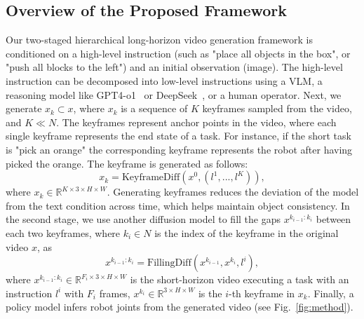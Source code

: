 \documentclass[letterpaper, 10 pt, conference]{ieeeconf}  %
\begin{document}


\subsection{Overview of the Proposed Framework}
\label{sec:overview}
Our two-staged hierarchical long-horizon video generation framework is conditioned on a high-level instruction (such as "place all objects in the box", or "push all blocks to the left") and an initial observation (image). The high-level instruction can be decomposed into low-level instructions using a VLM, a reasoning model like GPT4-o1~\cite{gpt4o1} or DeepSeek~\cite{deepseek}, or a human operator. Next, we generate $x_k \subset x$, where $x_k$ is a sequence of $K$ keyframes sampled from the video, and $K \ll N$. The keyframes represent anchor points in the video, where each single keyframe represents the end state of a task. For instance, if the short task is "pick an orange" the corresponding keyframe represents the robot after having picked the orange. The keyframe is generated as follows:
\begin{equation}
    x_k = \textrm{KeyframeDiff}(x^0,(l^1,...,l^K)),
\end{equation}
where $x_k \in \mathbb{R}^{  K \times 3 \times H \times W}$. Generating keyframes reduces the deviation of the model from the text condition across time, which helps maintain object consistency. In the second stage, we use another diffusion model to fill the gaps $x^{k_{i-1}:k_{i}}$ between each two keyframes, where $k_i \in N$ is the index of the keyframe in the original video $x$, as
\begin{equation}
    x^{k_{i-1}:k_{i}} = \textrm{FillingDiff}(x^{k_{i-1}},x^{k_i},l^i),
\end{equation}
where $x^{k_{i-1}:k_{i}} \in \mathbb{R}^{F_i \times 3 \times H \times W}$ is the short-horizon video executing a task with an instruction $l^i$ with $F_i$ frames, $x^{k_i} \in \mathbb{R}^{  3 \times H \times W}$ is the $i$-th keyframe in $x_k$. Finally, a policy model infers robot joints from the generated video (see Fig.~\ref{fig:method}).
\end{document}
